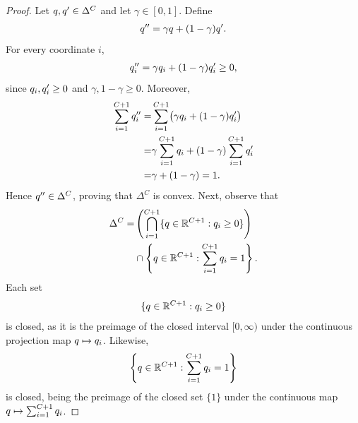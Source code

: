 \begin{proof}
    Let $q,q^{\prime} \in \Delta^C$ and let $\gamma\in[0,1]$. Define
    \begin{align*}
        q^{\prime\prime} = \gamma q + (1-\gamma)q^{\prime}.
    \end{align*}
    For every coordinate $i$,
    \begin{align*}
        q^{\prime\prime}_i = \gamma q_i + (1-\gamma)q^{\prime}_i \ge 0,
    \end{align*}
    since $q_i,q^{\prime}_i\ge 0$ and $\gamma,1-\gamma\ge 0$. Moreover,
    \begin{align*}
        \sum_{i=1}^{C+1} q^{\prime\prime}_i = & \sum_{i=1}^{C+1}\bigl(\gamma q_i+(1-\gamma)q^{\prime}_i\bigr)        \\
        =                                                    & \gamma\sum_{i=1}^{C+1} q_i + (1-\gamma)\sum_{i=1}^{C+1} q^{\prime}_i \\
        =                                                    & \gamma+(1-\gamma) =  1.
    \end{align*}
    Hence $q^{\prime\prime}\in\Delta^C$, proving that $\Delta^C$ is convex. Next, observe that
    \begin{align*}
        \Delta^C = & \left(\bigcap_{i=1}^{C+1}\{q\in\mathbb R^{C+1}: q_i\ge 0\}\right) \\
                   & \cap
        \left\{q\in\mathbb R^{C+1}:\sum_{i=1}^{C+1} q_i = 1\right\}.
    \end{align*}
    Each set
    \begin{align*}
        \{q\in\mathbb R^{C+1}: q_i\ge 0\}
    \end{align*}
    is closed, as it is the preimage of the closed interval
    $[0,\infty)$ under the continuous projection map
    $q\mapsto q_i$. Likewise,
    \begin{align*}
        \left\{
        q\in\mathbb R^{C+1}:
        \sum_{i=1}^{C+1} q_i = 1
        \right\}
    \end{align*}
    is closed, being the preimage of the closed set $\{1\}$
    under the continuous map
    $q\mapsto \sum_{i=1}^{C+1} q_i$.

\end{proof}
